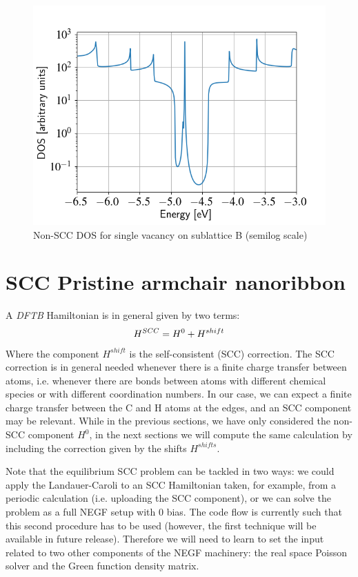 \documentclass[a4paper,11pt,english]{sphinxmanual}
\begin{document}
{{\begin{figure}[h]
\centering
\capstart
\includegraphics[width=0.700\linewidth]{nonscc-vac2-dos.png}
\caption{Non-SCC DOS for single vacancy on sublattice B (semilog scale)}\label{transport:fig-nonscc-vac2-dos}\end{figure}


\section{SCC Pristine armchair nanoribbon}
\label{transport:scc-pristine-armchair-nanoribbon}
A \emph{DFTB} Hamiltonian is in general given by two terms:
\begin{gather}
\begin{split}H^{SCC}=H^{0}+H^{shift}\end{split}\notag
\end{gather}
Where the component \(H^{shift}\) is the self-consistent (SCC)
correction. The SCC correction is in general needed whenever there is
a finite charge transfer between atoms, i.e. whenever there are bonds
between atoms with different chemical species or with different
coordination numbers. In our case, we can expect a finite charge
transfer between the C and H atoms at the edges, and an SCC component
may be relevant. While in the previous sections, we have only
considered the non-SCC component \(H^{0}\), in the next sections
we will compute the same calculation by including the correction given
by the shifts \(H^{shifts}\).

Note that the equilibrium SCC problem can be tackled in two ways: we
could apply the Landauer-Caroli to an SCC Hamiltonian taken, for
example, from a periodic calculation (i.e. uploading the SCC
component), or we can solve the problem as a full NEGF setup with 0
bias. The code flow is currently such that this second procedure has
to be used (however, the first technique will be available in future
release). Therefore we will need to learn to set the input related to
two other components of the NEGF machinery: the real space Poisson
solver and the Green function density matrix.

}}
\end{document}
